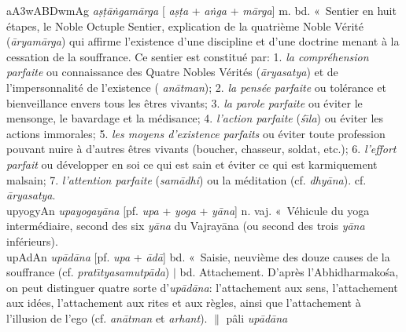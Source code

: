 \documentclass[a4paper,11pt,twocolumn]{article}
\begin{document}
{\dn a\3A3wA\3BDwmAg\0} {\em a\d{s}\d{t}\={a}\.{n}gam\={a}rga} [{\em
a\d{s}\d{t}a} + {\em a\.{n}ga} + {\em m\={a}rga}] m. bd. «~Sentier
en huit étapes\fg, le Noble Octuple Sentier, explication de la
quatrième Noble Vérité ({\em \={a}ryam\={a}rga}) qui affirme
l'existence d'une discipline et d'une doctrine menant à la cessation
de la souffrance. Ce sentier est constitué par: 1. {\em la
compréhension parfaite} ou connaissance des Quatre Nobles Vérités
({\em \={a}ryasatya}) et de l'impersonnalité de l'existence ({\em
an\={a}tman}); 2. {\em la pensée parfaite} ou tolérance et
bienveillance envers tous les êtres vivants; 3. {\em la parole
parfaite} ou éviter le mensonge, le bavardage et la médisance; 4. {\em
l'action parfaite}  ({\em \'{s}\={\i}la}) ou éviter les actions
immorales; 5. {\em les moyens d'existence parfaits} ou éviter toute
profession pouvant nuire à d'autres êtres vivants (boucher, chasseur,
soldat, etc.); 6. {\em l'effort parfait} ou développer en soi ce qui
est sain et éviter ce qui est karmiquement malsain; 7. {\em
l'attention parfaite} ({\em sam\={a}dhi}) ou la méditation (cf. {\em
dhy\={a}na}). cf. {\em \={a}ryasatya}. \\

{\dn upyogyAn} {\em upayogay\={a}na} [pf. {\em upa} + {\em yoga} +
{\em y\={a}na}] n. vaj. «~Véhicule du yoga intermédiaire\fg, second des
six {\em y\={a}na} du  Vajray\={a}na (ou second des trois {\em
y\={a}na} inférieurs). \\

{\dn upAdAn} {\em up\={a}d\={a}na} [pf. {\em upa} +
{\em \={a}d\={a}}] bd. «~Saisie\fg, neuvième des douze causes de la
souffrance (cf. {\em prat\={\i}tyasamutp\={a}da}) $\mid$
bd. Attachement. D'après l'Abhidharmako\'{s}a, on peut
distinguer quatre sorte  d'{\em up\={a}d\={a}na}: l'attachement aux
sens, l'attachement aux idées, l'attachement aux rites et aux règles,
ainsi que  l'attachement à l'illusion de l'ego (cf.
{\em an\={a}tman} et {\em arhant}). $\|$ pâli {\em up\={a}d\={a}na} \\
\end{document}
